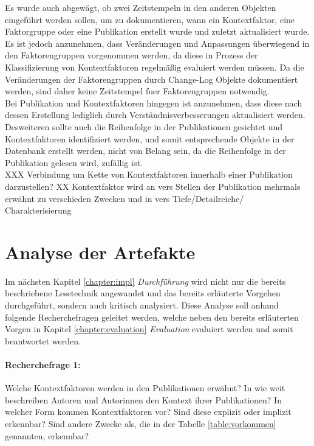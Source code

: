 Es wurde auch abgewägt, ob zwei Zeitstempeln in den anderen Objekten eingeführt werden sollen, um zu dokumentieren, wann ein Kontextfaktor, eine Faktorgruppe oder eine Publikation erstellt wurde und zuletzt aktualisiert wurde. \\
Es ist jedoch anzunehmen, dass Veränderungen und Anpassungen überwiegend in den Faktorengruppen vorgenommen werden, da diese in Prozess der Klassifizierung von Kontextfaktoren regelmäßig evaluiert werden müssen. Da die Veränderungen der Faktorengruppen durch Change-Log Objekte dokumentiert werden, sind daher keine Zeitstempel fuer Faktorengruppen notwendig.\\
Bei Publikation und Kontextfaktoren hingegen ist anzunehmen, dass diese nach dessen Erstellung lediglich durch Verständnisverbesserungen aktualisiert werden.  \\
Desweiteren sollte auch die Reihenfolge in der Publikationen gesichtet und Kontextfaktoren identifiziert werden, und somit entsprechende Objekte in der Datenbank erstellt werden, nicht von Belang sein, da die Reihenfolge in der Publikation gelesen wird, zufällig ist.\\

XXX Verbindung um Kette von Kontextfaktoren innerhalb einer Publikation darzustellen? 
XX Kontextfaktor wird an vers Stellen der Publikation mehrmals erwähnt zu verschieden Zwecken und in vers Tiefe/Detailreiche/ Charakterisierung


\section{Analyse der Artefakte}
\label{sec:analysis-step}
Im nächsten Kapitel \ref{chapter:impl} \textit{Durchführung} wird nicht nur die bereits beschriebene Lesetechnik angewandet und das bereits erläuterte Vorgehen durchgeführt, sondern auch kritisch analysiert. Diese Analyse soll anhand folgende Recherchefragen geleitet werden, welche neben den bereits erläuterten Vorgen in Kapitel \ref{chapter:evaluation} \textit{Evaluation} evaluiert werden und somit beantwortet werden. \\

\paragraph{Recherchefrage 1:} Welche Kontextfaktoren werden in den Publikationen erwähnt? In wie weit beschreiben Autoren und Autorinnen den Kontext ihrer Publikationen? In welcher Form kommen Kontextfaktoren vor? Sind diese explizit oder implizit erkennbar? Sind andere Zwecke als, die in der Tabelle \ref{table:vorkommen} genannten, erkennbar? 

